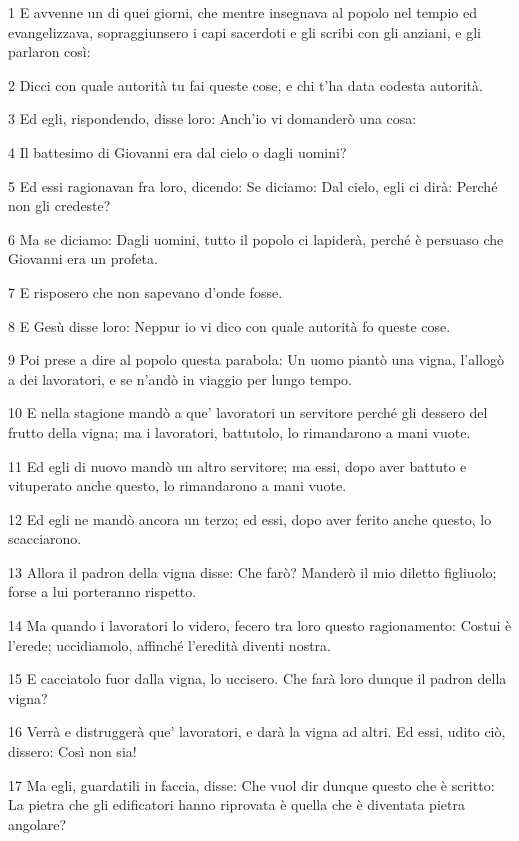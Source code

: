 \par 1 E avvenne un di quei giorni, che mentre insegnava al popolo nel tempio ed evangelizzava, sopraggiunsero i capi sacerdoti e gli scribi con gli anziani, e gli parlaron così:
\par 2 Dicci con quale autorità tu fai queste cose, e chi t'ha data codesta autorità.
\par 3 Ed egli, rispondendo, disse loro: Anch'io vi domanderò una cosa:
\par 4 Il battesimo di Giovanni era dal cielo o dagli uomini?
\par 5 Ed essi ragionavan fra loro, dicendo: Se diciamo: Dal cielo, egli ci dirà: Perché non gli credeste?
\par 6 Ma se diciamo: Dagli uomini, tutto il popolo ci lapiderà, perché è persuaso che Giovanni era un profeta.
\par 7 E risposero che non sapevano d'onde fosse.
\par 8 E Gesù disse loro: Neppur io vi dico con quale autorità fo queste cose.
\par 9 Poi prese a dire al popolo questa parabola: Un uomo piantò una vigna, l'allogò a dei lavoratori, e se n'andò in viaggio per lungo tempo.
\par 10 E nella stagione mandò a que' lavoratori un servitore perché gli dessero del frutto della vigna; ma i lavoratori, battutolo, lo rimandarono a mani vuote.
\par 11 Ed egli di nuovo mandò un altro servitore; ma essi, dopo aver battuto e vituperato anche questo, lo rimandarono a mani vuote.
\par 12 Ed egli ne mandò ancora un terzo; ed essi, dopo aver ferito anche questo, lo scacciarono.
\par 13 Allora il padron della vigna disse: Che farò? Manderò il mio diletto figliuolo; forse a lui porteranno rispetto.
\par 14 Ma quando i lavoratori lo videro, fecero tra loro questo ragionamento: Costui è l'erede; uccidiamolo, affinché l'eredità diventi nostra.
\par 15 E cacciatolo fuor dalla vigna, lo uccisero. Che farà loro dunque il padron della vigna?
\par 16 Verrà e distruggerà que' lavoratori, e darà la vigna ad altri. Ed essi, udito ciò, dissero: Così non sia!
\par 17 Ma egli, guardatili in faccia, disse: Che vuol dir dunque questo che è scritto: La pietra che gli edificatori hanno riprovata è quella che è diventata pietra angolare?
